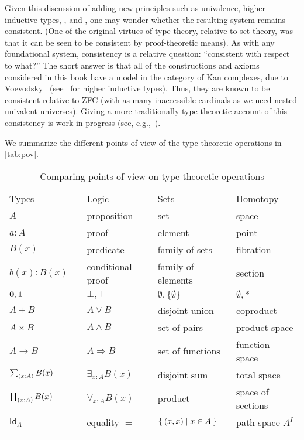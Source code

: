 Given this discussion of adding new principles such as univalence, higher inductive types, \choice{}, and \LEM{}, one may wonder whether the resulting system remains consistent.
(One of the original virtues of type theory, relative to set theory, was that it can be seen to be consistent by proof-theoretic means).
As with any foundational system, consistency is a relative question: ``consistent with respect to what?''
The short answer is that all of the constructions and axioms considered in this book have a model in the category of Kan complexes, due to Voevodsky~\cite{klv:ssetmodel} (see~\cite{ls:hits} for higher inductive types).
Thus, they are known to be consistent relative to ZFC (with as many inaccessible cardinals
%
as we need nested univalent universes).
Giving a more traditionally type-theoretic account of this consistency is work in progress (see,
e.g.,~\cite{lh:canonicity,coquand2012constructive}).

We summarize the different points of view of the type-theoretic operations in \autoref{tab:pov}.

\begin{table}[htb]
  \centering
  \OPTsmalltable
 \begin{tabular}{lllll}
    \toprule
       Types && Logic & Sets & Homotopy\\ \addlinespace[2pt]
    \midrule
       $A$ && proposition & set & space\\ \addlinespace[2pt]
       $a:A$ && proof & element & point \\ \addlinespace[2pt]
       $B(x)$ && predicate & family of sets & fibration \\ \addlinespace[2pt]
       $b(x) : B(x)$ && conditional proof & family of elements & section\\ \addlinespace[2pt]
       $\mathbf{0}, \mathbf{1}$ && $\bot, \top$ & $\emptyset, \{ \emptyset \}$ & $\emptyset, *$\\ \addlinespace[2pt]
       $A + B$ && $A\vee B$ & disjoint union & coproduct\\ \addlinespace[2pt]
       $A\times B$ && $A\wedge B$ & set of pairs & product space\\ \addlinespace[2pt]
       $A\to B$ && $A\Rightarrow B$ & set of functions & function space\\ \addlinespace[2pt]
       $\sm{x:A}B(x)$ &&  $\exists_{x:A}B(x)$ & disjoint sum & total space\\ \addlinespace[2pt]
       $\prd{x:A}B(x)$ &&  $\forall_{x:A}B(x)$ & product & space of sections\\ \addlinespace[2pt]
       $\mathsf{Id}_{A}$ && equality $=$ & $\Set{{\mathopen{}(x,x)\mathclose{}} | x\in A}$ & path space $A^I$ \\ \addlinespace[2pt]
    \bottomrule
  \end{tabular}
  \caption{Comparing points of view on type-theoretic operations}\label{tab:pov}
\end{table}


